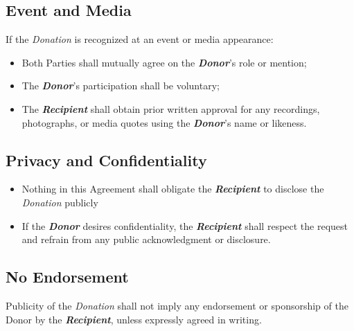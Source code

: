\subsection{Event and Media}
If the \textit{Donation} is recognized at an event or media appearance:
\begin{itemize}
  \item Both Parties shall mutually agree on the \textbf{\textit{Donor}}’s role or mention;
  \item The \textbf{\textit{Donor}}’s participation shall be voluntary;
  \item The \textbf{\textit{Recipient}} shall obtain prior written approval for any recordings, photographs, or media quotes using the \textbf{\textit{Donor}}’s name or likeness.
\end{itemize}

\subsection{Privacy and Confidentiality}
\begin{itemize}
  \item Nothing in this Agreement shall obligate the \textbf{\textit{Recipient}} to disclose the \textit{Donation} publicly
  \item If the \textbf{\textit{Donor}} desires confidentiality, the \textbf{\textit{Recipient}} shall respect the request and refrain from any public acknowledgment or disclosure.
\end{itemize}

\subsection{No Endorsement}
Publicity of the \textit{Donation} shall not imply any endorsement or sponsorship of the Donor by the \textbf{\textit{Recipient}}, unless expressly agreed in writing.

